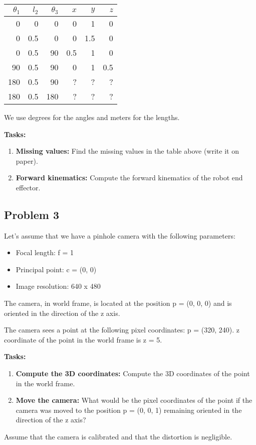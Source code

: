 \documentclass{article}
\begin{document}
\begin{tabular}{r|r|r|r|r|r}
    $\theta_1$ & $l_2$ & $\theta_3$ & $x$ & $y$ & $z$ \\
    \hline
    0          & 0     & 0          & 0   & 1   & 0   \\
    0          & 0.5   & 0          & 0   & 1.5 & 0   \\
    0          & 0.5   & 90         & 0.5 & 1   & 0   \\
    90         & 0.5   & 90         & 0   & 1   & 0.5 \\
    180        & 0.5   & 90         & ?   & ?   & ?   \\
    180        & 0.5   & 180        & ?   & ?   & ?   \\
\end{tabular}

We use degrees for the angles and meters for the lengths.

\textbf{Tasks:}

\begin{enumerate}
    \item \textbf{Missing values:} Find the missing values in the table above (write it on paper).
    \item \textbf{Forward kinematics:} Compute the forward kinematics of the robot end effector.
\end{enumerate}

\subsection*{Problem 3}
Let's assume that we have a pinhole camera with the following parameters:

\begin{itemize}
    \item Focal length: f = 1
    \item Principal point: c = (0, 0)
    \item Image resolution: 640 x 480
\end{itemize}

The camera, in world frame, is located at the position p = (0, 0, 0) and is oriented in the direction of the z axis.

The camera sees a point at the following pixel coordinates: p = (320, 240). z coordinate of the point in the world frame is z = 5.

\textbf{Tasks:}

\begin{enumerate}
    \item \textbf{Compute the 3D coordinates:} Compute the 3D coordinates of the point in the world frame.
    \item \textbf{Move the camera:} What would be the pixel coordinates of the point if the camera was moved to the position p = (0, 0, 1) remaining oriented in the direction of the z axis?
\end{enumerate}

Assume that the camera is calibrated and that the distortion is negligible.
\end{document}
